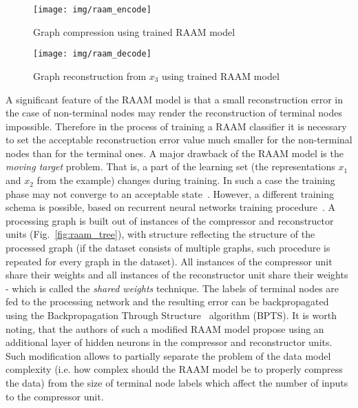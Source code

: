 \begin{figure}
\begin{center}
	\texttt{[image: img/raam\_encode]}
	\caption{Graph compression using trained RAAM model}
	\label{fig:raam_compression}
\end{center}
\end{figure}

\begin{figure}
\begin{center}
	\texttt{[image: img/raam\_decode]}
	\caption{Graph reconstruction from $x_3$ using trained RAAM model}
	\label{fig:raam_reconstruction}
\end{center}
\end{figure}



A significant feature of the RAAM model is that a small reconstruction error in the case of non-terminal nodes may render the reconstruction of terminal nodes impossible. Therefore in the process of training a RAAM classifier it is necessary to set the acceptable reconstruction error value much smaller for the non-terminal nodes than for the terminal ones. A major drawback of the RAAM model is the \emph{moving target} problem. That is, a part of the learning set (the representations $x_1$ and $x_2$ from the example) changes during training. In such a case the training phase may not converge to an acceptable state~\cite{goulon2005hopfield}. However, a different training schema is possible, based on recurrent neural networks training procedure~\cite{goulon2005hopfield}. A processing graph is built out of instances of the compressor and reconstructor units (Fig.~\ref{fig:raam_tree}), with structure reflecting the structure of the processed graph (if the dataset consists of multiple graphs, such procedure is repeated for every graph in the dataset). All instances of the compressor unit share their weights and all instances of the reconstructor unit share their weights - which is called the \emph{shared weights} technique. The labels of terminal nodes are fed to the processing network and the resulting error can be backpropagated using the Backpropagation Through Structure~\cite{kuchler1996inductive} algorithm (BPTS). It is worth noting, that the authors of such a modified RAAM model propose using an additional layer of hidden neurons in the compressor and reconstructor units. Such modification allows to partially separate the problem of the data model complexity (i.e. how complex should the RAAM model be to properly compress the data) from the size of terminal node labels which affect the number of inputs to the compressor unit.

